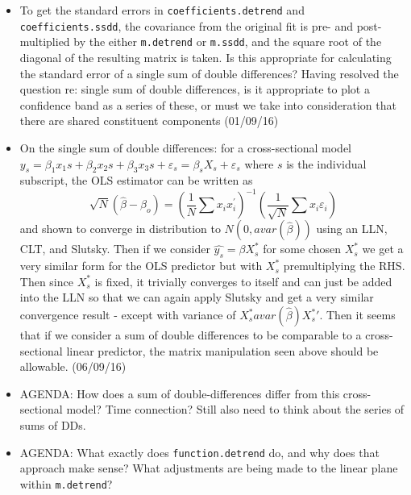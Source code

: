 \documentclass[]{article}
\begin{document}
\begin{itemize}
\item To get the standard errors in \texttt{coefficients.detrend} and \texttt{coefficients.ssdd}, the covariance from the original fit is pre- and post-multiplied by the either \texttt{m.detrend} or \texttt{m.ssdd}, and the square root of the diagonal of the resulting matrix is taken. Is this appropriate for calculating the standard error of a single sum of double differences? Having resolved the question re: single sum of double differences, is it appropriate to plot a confidence band as a series of these, or must we take into consideration that there are shared constituent components (01/09/16)
\item On the single sum of double differences: for a cross-sectional model $ y_s = \beta_1 x_1s + \beta_2 x_2s + \beta_3 x_3s + \varepsilon_s = \beta_s X_s + \varepsilon_s$ where $s$ is the individual subscript, the OLS estimator can be written as \[ \sqrt{N}(\hat{\beta}-\beta_o)=\left(\frac{1}{N} \sum x_i x_i^\prime\right)^{-1} \left(\frac{1}{\sqrt{N}} \sum x_i \varepsilon_i\right) \] and shown to converge in distribution to $ N \left( 0, avar(\hat{\beta})\right) $ using an LLN, CLT, and Slutsky. Then if we consider $\hat{y_s}=\beta X_s^*$ for some chosen $X_s^*$ we get a very similar form for the OLS predictor but with $ X_s^* $ premultiplying the RHS. Then since $X_s^*$ is fixed, it trivially converges to itself and can just be added into the LLN so that we can again apply Slutsky and get a very similar convergence result - except with variance of $ X_s^* avar(\hat{\beta}) X_s^*\prime $. Then it seems that if we consider a sum of double differences to be comparable to a cross-sectional linear predictor, the matrix manipulation seen above should be allowable. (06/09/16)
\item AGENDA: How does a sum of double-differences differ from this cross-sectional model? Time connection? Still also need to think about the series of sums of DDs.
\item AGENDA: What exactly does \texttt{function.detrend} do, and why does that approach make sense? What adjustments are being made to the linear plane within \texttt{m.detrend}?
\end{itemize}
\end{document}
